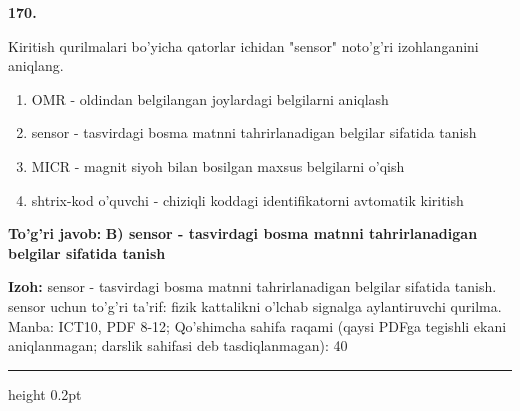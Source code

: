 \documentclass[10pt,a4paper]{article}
\begin{document}
{\bfseries\sffamily\color{ink} 170.}
\par
Kiritish qurilmalari bo'yicha qatorlar ichidan "sensor" noto'g'ri izohlanganini aniqlang.
\begin{enumerate}[label=\Alph*),leftmargin=9mm]
\item OMR - oldindan belgilangan joylardagi belgilarni aniqlash
\item sensor - tasvirdagi bosma matnni tahrirlanadigan belgilar sifatida tanish
\item MICR - magnit siyoh bilan bosilgan maxsus belgilarni o'qish
\item shtrix-kod o'quvchi - chiziqli koddagi identifikatorni avtomatik kiritish
\end{enumerate}
\begin{tcolorbox}[enhanced,breakable,colback=teal!4,colframe=teal!60!black,boxrule=0.45pt,arc=1.2mm,left=2.7mm,right=2.7mm,top=1.8mm,bottom=1.8mm,before skip=2mm,after skip=2mm]
{\bfseries\sffamily\color{teal}To'g'ri javob:} \textbf{B) sensor - tasvirdagi bosma matnni tahrirlanadigan belgilar sifatida tanish}
\par\smallskip
{\bfseries Izoh:} sensor - tasvirdagi bosma matnni tahrirlanadigan belgilar sifatida tanish. sensor uchun to'g'ri ta'rif: fizik kattalikni o'lchab signalga aylantiruvchi qurilma. Manba: ICT10, PDF 8-12; Qo'shimcha sahifa raqami (qaysi PDFga tegishli ekani aniqlanmagan; darslik sahifasi deb tasdiqlanmagan): 40
\end{tcolorbox}
\vspace{2mm}\hrule height 0.2pt\vspace{3mm}
\end{document}
